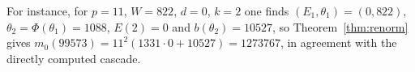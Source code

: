 For instance, for $p=11$, $W=822$, $d=0$, $k=2$ one finds $(E_1,\theta_1)=(0,822)$, $\theta_2=\Phi(\theta_1)=1088$, $E(2)=0$ and $b(\theta_2)=10527$, so Theorem~\ref{thm:renorm} gives $m_0(99573)=11^2(1331\cdot0+10527)=1273767$, in agreement with the directly computed cascade.
